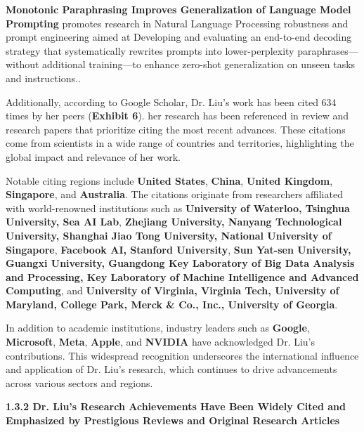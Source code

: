 \documentclass{article}
\begin{document}
\textbf{Monotonic Paraphrasing Improves Generalization of Language Model Prompting} promotes research in Natural Language Processing robustness and prompt engineering aimed at Developing and evaluating an end-to-end decoding strategy that systematically rewrites prompts into lower-perplexity paraphrases—without additional training—to enhance zero-shot generalization on unseen tasks and instructions..

Additionally, according to Google Scholar, Dr. Liu's work has been cited 634 times by her peers (\textbf{Exhibit 6}). her research has been referenced in review and research papers that prioritize citing the most recent advances. These citations come from scientists in a wide range of countries and territories, highlighting the global impact and relevance of her work.

Notable citing regions include \textbf{United States}, \textbf{China}, \textbf{United Kingdom}, \textbf{Singapore}, and \textbf{Australia}. The citations originate from researchers affiliated with world-renowned institutions such as \textbf{University of Waterloo, Tsinghua University, Sea AI Lab}, \textbf{Zhejiang University, Nanyang Technological University, Shanghai Jiao Tong University, National University of Singapore}, \textbf{Facebook AI, Stanford University}, \textbf{Sun Yat-sen University, Guangxi University, Guangdong Key Laboratory of Big Data Analysis and Processing, Key Laboratory of Machine Intelligence and Advanced Computing}, and \textbf{University of Virginia, Virginia Tech, University of Maryland, College Park, Merck \& Co., Inc., University of Georgia}.

In addition to academic institutions, industry leaders such as \textbf{Google}, \textbf{Microsoft}, \textbf{Meta}, \textbf{Apple}, and \textbf{NVIDIA} have acknowledged Dr. Liu's contributions. This widespread recognition underscores the international influence and application of Dr. Liu's research, which continues to drive advancements across various sectors and regions.








{\bf 1.3.2 Dr. Liu's Research Achievements Have Been Widely Cited and Emphasized by Prestigious Reviews and Original Research Articles}
\end{document}
